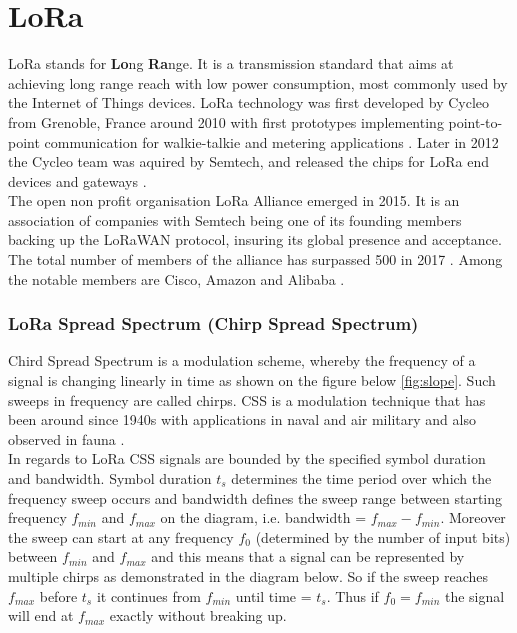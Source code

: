 \chapter{LoRa}

LoRa stands for \textbf{Lo}ng \textbf{Ra}nge. It is a transmission standard that aims at achieving long range reach with low power consumption, most commonly used by the Internet of Things devices. LoRa technology was first developed by Cycleo from Grenoble, France around 2010 with first prototypes implementing point-to-point communication for walkie-talkie and metering applications \cite{trinity_panel}. Later in 2012 the Cycleo team was aquired by Semtech, and released the chips for LoRa end devices and gateways \cite{origins}. \\

The open non profit organisation LoRa Alliance emerged in 2015\cite{alliance}. 
It is an association of companies with Semtech being one of
its founding members \cite{alliance_founder} backing up the LoRaWAN protocol, insuring its
global presence and acceptance. The total number of members of the alliance has surpassed 500 in 2017 \cite{500_members}. Among the notable members are Cisco, Amazon and Alibaba \cite{alliance_members}.

\subsection{LoRa Spread Spectrum (Chirp Spread Spectrum)}


Chird Spread Spectrum is a modulation scheme, whereby the frequency of a signal is changing linearly in time \cite{ieee_2007} as shown on the figure below \ref{fig:slope}. Such sweeps in frequency are called chirps. CSS is a modulation technique that has been around since 1940s
\cite{semtech_spec} with applications in naval and air military and also observed in fauna \cite{origins}.\\

In regards to LoRa CSS signals are bounded by the specified symbol duration and bandwidth. Symbol duration $t_s$ determines the time period over which the frequency sweep occurs and bandwidth defines the sweep range between starting frequency $f_{min}$ and $f_{max}$ on the diagram, i.e. bandwidth = $f_{max} - f_{min}$. Moreover the sweep can start at any frequency $f_0$ (determined by the number of input bits) between $f_{min}$ and $f_{max}$ and this means that a signal can be represented by multiple chirps as demonstrated in the
diagram below. So if the sweep reaches $f_{max}$ before $t_s$ it 
continues from $f_{min}$ until time = $t_s$. Thus if $f_0 = f_{min}$
the signal will end at $f_{max}$ exactly without breaking up. 

